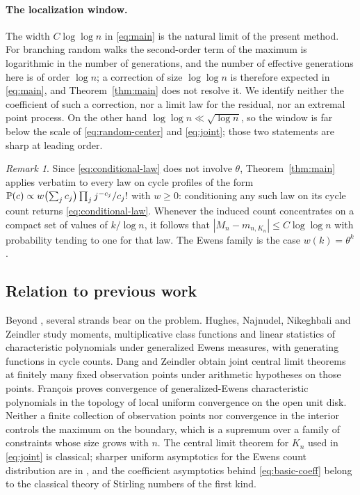 \documentclass[11pt]{article}
\theoremstyle{definition}\newtheorem{definition}[theorem]{Definition}
\theoremstyle{remark}\newtheorem{remark}[theorem]{Remark}
\numberwithin{equation}{section}\allowdisplaybreaks
\begin{document}
\paragraph{The localization window.} The width $C\log\log n$ in
\eqref{eq:main} is the natural limit of the present method. For
branching random walks the second-order term of the maximum is
logarithmic in the number of generations, and the number of effective
generations here is of order $\log n$; a correction of size $\log\log n$
is therefore expected in \eqref{eq:main}, and Theorem~\ref{thm:main}
does not resolve it. We identify neither the coefficient of such a
correction, nor a limit law for the residual, nor an extremal point
process. On the other hand $\log\log n\ll\sqrt{\log n}$, so the window
is far below the scale of \eqref{eq:random-center} and \eqref{eq:joint};
those two statements are sharp at leading order.

\begin{remark}\label{rem:family}
Since \eqref{eq:conditional-law} does not involve $\theta$,
Theorem~\ref{thm:main} applies verbatim to every law on cycle profiles
of the form
$\mathbb P(c)\propto w\bigl(\sum_jc_j\bigr)\prod_jj^{-c_j}/c_j!$ with
$w\ge0$: conditioning any such law on its cycle count returns
\eqref{eq:conditional-law}. Whenever the induced count concentrates on a
compact set of values of $k/\log n$, it follows that
$|M_n-m_{n,K_n}|\le C\log\log n$ with probability tending to one for
that law. The Ewens family is the case $w(k)=\theta^k$.
\end{remark}

\subsection{Relation to previous work}\label{subsec:previous}

Beyond \cite{CZ}, several strands bear on the problem. Hughes,
Najnudel, Nikeghbali and Zeindler \cite{HNNZ} study moments,
multiplicative class functions and linear statistics of characteristic
polynomials under generalized Ewens measures, with generating functions
in cycle counts. Dang and Zeindler \cite{DZ} obtain joint central limit
theorems at finitely many fixed observation points under arithmetic
hypotheses on those points. Fran\c{c}ois \cite[Theorem~2.2]{Francois}
proves convergence of generalized-Ewens characteristic polynomials in
the topology of local uniform convergence on the open unit disk. Neither
a finite collection of observation points nor convergence in the
interior controls the maximum on the boundary, which is a supremum over
a family of constraints whose size grows with $n$. The central limit
theorem for $K_n$ used in \eqref{eq:joint} is classical; sharper uniform
asymptotics for the Ewens count distribution are in \cite{KMS}, and the
coefficient asymptotics behind \eqref{eq:basic-coeff} belong to the
classical theory of Stirling numbers of the first kind.
\end{document}
